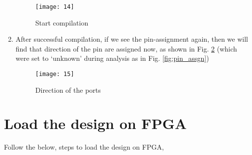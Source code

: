\begin{enumerate}
	\begin{figure}
		\centering
		\texttt{[image: 14]}
		\caption{Start compilation}
		\label{fig:start_compilation}
	\end{figure}	
	
	\item After successful compilation, if we see the pin-assignment again, then we will find that direction of the pin are assigned now, as shown in Fig. \ref{fig:pin_assgn_direction} (which were set to `unknown' during analysis as in Fig. \ref{fig:pin_assgn})
	
	\begin{figure}[!h]
		\centering
		\texttt{[image: 15]}
		\caption{Direction of the ports}
		\label{fig:pin_assgn_direction}
	\end{figure}
	
\end{enumerate}

\section{Load the design on FPGA} \label{sec:load_fpga_design}

Follow the below, steps to load the design on FPGA, 

